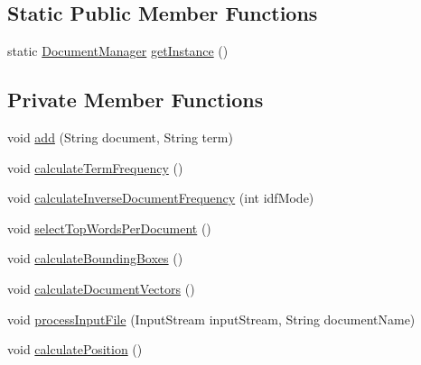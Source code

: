 \subsection*{Static Public Member Functions}
\begin{DoxyCompactItemize}
\item 
static \mbox{\hyperlink{classio_1_1github_1_1syzygy2048_1_1radcloud_1_1_document_manager}{Document\+Manager}} \mbox{\hyperlink{classio_1_1github_1_1syzygy2048_1_1radcloud_1_1_document_manager_abb1a711c0690a259a1081c573396b84a}{get\+Instance}} ()
\end{DoxyCompactItemize}
\subsection*{Private Member Functions}
\begin{DoxyCompactItemize}
\item 
void \mbox{\hyperlink{classio_1_1github_1_1syzygy2048_1_1radcloud_1_1_document_manager_aecdf1d11ec1b9a2db9cdb0f60b1c1184}{add}} (String document, String term)
\item 
void \mbox{\hyperlink{classio_1_1github_1_1syzygy2048_1_1radcloud_1_1_document_manager_adcf3b63232181ceb86abc91a5a37cf0f}{calculate\+Term\+Frequency}} ()
\item 
void \mbox{\hyperlink{classio_1_1github_1_1syzygy2048_1_1radcloud_1_1_document_manager_aff9c934ec9c1c61a56bfacf2ffe30ca1}{calculate\+Inverse\+Document\+Frequency}} (int idf\+Mode)
\item 
void \mbox{\hyperlink{classio_1_1github_1_1syzygy2048_1_1radcloud_1_1_document_manager_a9b7a1e94d648221841ecc5d5c5650f0b}{select\+Top\+Words\+Per\+Document}} ()
\item 
void \mbox{\hyperlink{classio_1_1github_1_1syzygy2048_1_1radcloud_1_1_document_manager_a7418a74e1d0a3a7677875d525a12b2f1}{calculate\+Bounding\+Boxes}} ()
\item 
void \mbox{\hyperlink{classio_1_1github_1_1syzygy2048_1_1radcloud_1_1_document_manager_a7c3bd4342ae38a0876b0fecdddf95de7}{calculate\+Document\+Vectors}} ()
\item 
void \mbox{\hyperlink{classio_1_1github_1_1syzygy2048_1_1radcloud_1_1_document_manager_a9fab6a75480c9f0aa1fa2085359dd8fa}{process\+Input\+File}} (Input\+Stream input\+Stream, String document\+Name)
\item 
void \mbox{\hyperlink{classio_1_1github_1_1syzygy2048_1_1radcloud_1_1_document_manager_a42be8000ada29b9f9a45a48f0804f760}{calculate\+Position}} ()
\item 

\end{DoxyCompactItemize}
